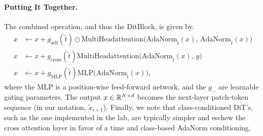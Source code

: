 \begin{remarkbox}
\paragraph{Putting It Together.}
The combined operation, and thus the DitBlock, is given by.
\begin{align*}
x &\gets x + g_\text{self}(\tilde{t})\odot \mathrm{MultiHeadattention}\!\big(\mathrm{AdaNorm}_{\tilde t}(x),\,\mathrm{AdaNorm}_{\tilde t}(x)\big)\\
x &\gets x + g_\text{cross}(\tilde{t})\mathrm{MultiHeadattention}\!\big(\mathrm{AdaNorm}_{\tilde t}(x),\,y\big)\\
x &\gets x + g_\text{MLP}(\tilde{t})\mathrm{MLP}\!\big(\mathrm{AdaNorm}_{\tilde t}(x)\big),
\end{align*}
where the MLP is a position-wise feed-forward network, and the $g_{\cdots}$ are learnable gating parameters. The output $x\in \mathbb{R}^{N\times d}$ becomes the next-layer
patch-token sequence (in our notation, $\tilde x_{i+1}$). Finally, we note that class-conditioned DiT's, such as the one implemented in the lab, are typically simpler and eschew the cross attention layer in favor of a time and class-based AdaNorm conditioning.
\end{remarkbox}



